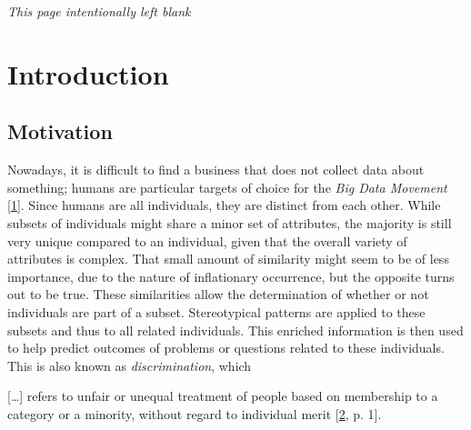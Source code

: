 \documentclass[12pt,english,a4paper,titlepage,cleardoublepage=empty,dottedtoc]{report}
\let\origquote\quote
\let\endorigquote\endquote
\renewenvironment{quote}{%
    \origquote
    \itshape
}
{\endorigquote}
\begin{document}
\vspace*{\fill}

\begin{center}
\thispagestyle{empty}
\setcounter{page}{0}
\emph{This page intentionally left blank}
\end{center}

\vspace*{\fill} \newpage

\chapter{Introduction}\label{introduction}

\section{Motivation}\label{motivation}

Nowadays, it is difficult to find a business that does not collect data
about something; humans are particular targets of choice for the
\emph{Big Data Movement}
{[}\protect\hyperlink{ref-web_2016_privacy-international-about-big-data}{1}{]}.
Since humans are all individuals, they are distinct from each other.
While subsets of individuals might share a minor set of attributes, the
majority is still very unique compared to an individual, given that the
overall variety of attributes is complex. That small amount of
similarity might seem to be of less importance, due to the nature of
inflationary occurrence, but the opposite turns out to be true. These
similarities allow the determination of whether or not individuals are
part of a subset. Stereotypical patterns are applied to these subsets
and thus to all related individuals. This enriched information is then
used to help predict outcomes of problems or questions related to these
individuals. This is also known as \emph{discrimination}, which

\begin{quote}
{[}\ldots{}{]} refers to unfair or unequal treatment of people based on
membership to a category or a minority, without regard to individual
merit
{[}\protect\hyperlink{ref-paper_2008_discrimination-aware-data-mining}{2},
p. 1{]}.
\end{quote}
\end{document}
